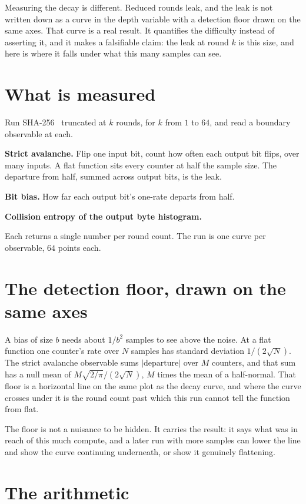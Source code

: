 Measuring the decay is different. Reduced rounds leak, and the leak is not written down as a curve in the depth variable with a detection floor drawn on the same axes. That curve is a real result. It quantifies the difficulty instead of asserting it, and it makes a falsifiable claim: the leak at round \(k\) is this size, and here is where it falls under what this many samples can see.

\section{What is measured}

Run SHA-256~\cite{src:FIPS-180-4} truncated at \(k\) rounds, for \(k\) from \(1\) to \(64\), and read a boundary observable at each.

\textbf{Strict avalanche.} Flip one input bit, count how often each output bit flips, over many inputs. A flat function sits every counter at half the sample size. The departure from half, summed across output bits, is the leak.

\textbf{Bit bias.} How far each output bit's one-rate departs from half.

\textbf{Collision entropy of the output byte histogram.}

Each returns a single number per round count. The run is one curve per observable, \(64\) points each.

\section{The detection floor, drawn on the same axes}

A bias of size \(b\) needs about \(1/b^2\) samples to see above the noise. At a flat function one counter's rate over \(N\) samples has standard deviation \(1/(2\sqrt{N})\). The strict avalanche observable sums \(|\text{departure}|\) over \(M\) counters, and that sum has a null mean of \(M\sqrt{2/\pi}/(2\sqrt{N})\), \(M\) times the mean of a half-normal. That floor is a horizontal line on the same plot as the decay curve, and where the curve crosses under it is the round count past which this run cannot tell the function from flat.

The floor is not a nuisance to be hidden. It carries the result: it says what was in reach of this much compute, and a later run with more samples can lower the line and show the curve continuing underneath, or show it genuinely flattening.

\section{The arithmetic}

